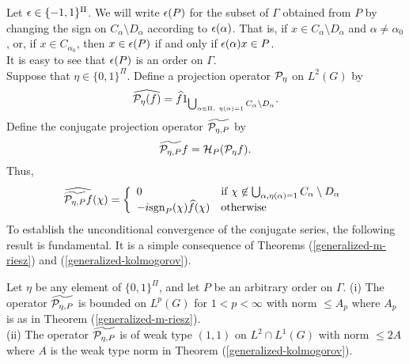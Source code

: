 Let 
$\epsilon\in \{ - 1 , 1\}^\Pi$.
We will write $\epsilon (P)$ for 
the subset of $\Gamma$ obtained from $P$
by changing the sign on $C_\alpha\setminus D_\alpha$
according to $\epsilon(\alpha)$.  That is,
if $x\in C_\alpha\setminus D_\alpha$ and 
$\alpha\neq \alpha_0$, or,
if $x\in C_{\alpha_0}$, then
$x\in \epsilon(P)$ if and only if $\epsilon(\alpha) x\in P$.\\
It is easy to see that $\epsilon(P)$ is an order 
on $\Gamma$.  \\
Suppose that $\eta\in \{ 0 , 1\}^\Pi$.
Define a projection operator 
${\cal P}_\eta$ 
on $L^2(G)$ by
$$\widehat{{\cal P}_\eta (f)}=
\widehat{f}1_{\bigcup_{\alpha\in \Pi, \ \eta(\alpha)=1}
C_\alpha\setminus D_\alpha}.$$
Define the conjugate projection operator
$\widetilde{{\cal P}_{\eta, P}}$
by 
\begin{equation}
\widetilde{{\cal P}_{\eta, P}}f=
{\cal H}_P ({\cal P}_\eta f).
\label{conjugate-projection-operator}
\end{equation}
%
Thus,
\begin{equation}
\widehat{\widetilde{{\cal P}_{\eta, P}}f}(\chi) =
\left\{
\begin{array}{ll}
0 	& 	\mbox{if $\chi\not\in 
		\bigcup_{\alpha, \eta(\alpha) =1}
		C_\alpha\setminus D_\alpha$}\\
- i {\rm sgn}_P(\chi ) \widehat {f} (\chi) &	\mbox{otherwise}
\end{array}
\right.
\label{fourier-transform-of-conjugate-slice}
\end{equation}
To establish the unconditional 
convergence of the conjugate series,
the following result is fundamental.  
It is a simple consequence of 
Theorems (\ref{generalized-m-riesz}) and
(\ref{generalized-kolmogorov}).
\begin{conjugate-projection}
Let $\eta$ be any element of
$\{0,1\}^\Pi$, and let $P$ be an arbitrary order
on $\Gamma$.  
(i)  The operator 
$\widetilde{{\cal P}_{\eta, P}}$
is bounded on $L^p(G)$ for $1<p<\infty$ with
norm $\leq A_p$ where
$A_p$ is as in Theorem (\ref{generalized-m-riesz}).\\
(ii) The operator 
$\widetilde{{\cal P}_{\eta, P}}$
is of weak type $(1,1)$ on $L^2\cap L^1(G)$
with norm $\leq 2A$
where $A$ is the weak type norm in 
Theorem (\ref{generalized-kolmogorov}).
\label{conjugate-projection}
\end{conjugate-projection}  
